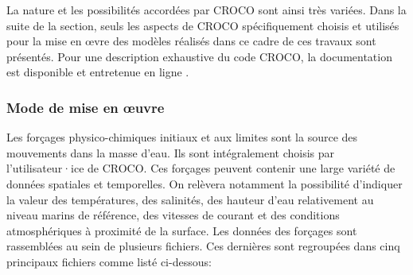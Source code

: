 \documentclass[10pt,a4paper,titlepage]{article}
\begin{document}
La nature et les possibilités accordées par CROCO sont ainsi très variées.
Dans la suite de la section, seuls les aspects de CROCO spécifiquement choisis et utilisés pour la mise en \oe{}vre des modèles réalisés dans ce cadre de ces travaux sont présentés.
Pour une description exhaustive du code CROCO, la documentation est disponible et entretenue en ligne \cite{documentation_croco}.

\subsubsection{Mode de mise en \oe{}uvre}
\label{subsub:presentation_generale}
Les forçages physico-chimiques initiaux et aux limites sont la source des mouvements dans la masse d'eau.
Ils sont intégralement choisis par l'utilisateur·ice de CROCO.
Ces forçages peuvent contenir une large variété de données spatiales et temporelles.
On relèvera notamment la possibilité d'indiquer la valeur des températures, des salinités, des hauteur d'eau relativement au niveau marins de référence, des vitesses de courant et des conditions atmosphériques à proximité de la surface.
Les données des forçages sont rassemblées au sein de plusieurs fichiers.
Ces dernières sont regroupées dans cinq principaux fichiers comme listé ci-dessous:
\end{document}
